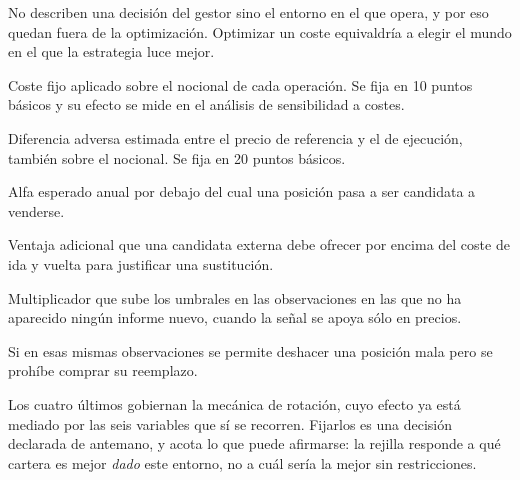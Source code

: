 No describen una decisión del gestor sino el entorno en el que opera, y por eso quedan fuera de la
optimización. Optimizar un coste equivaldría a elegir el mundo en el que la estrategia luce mejor.

\begin{description}[leftmargin=0cm,style=nextline,itemsep=0.5em]
  \item[Comisión] Coste fijo aplicado sobre el nocional de cada operación. Se fija en 10 puntos
  básicos y su efecto se mide en el análisis de sensibilidad a costes.
  \item[\textit{Slippage}] Diferencia adversa estimada entre el precio de referencia y el de
  ejecución, también sobre el nocional. Se fija en 20 puntos básicos.
  \item[Alfa mínimo de salida] Alfa esperado anual por debajo del cual una posición pasa a ser
  candidata a venderse.
  \item[Margen de rotación] Ventaja adicional que una candidata externa debe ofrecer por encima del
  coste de ida y vuelta para justificar una sustitución.
  \item[Endurecimiento sin fundamentales nuevos] Multiplicador que sube los umbrales en las
  observaciones en las que no ha aparecido ningún informe nuevo, cuando la señal se apoya sólo en
  precios.
  \item[Sólo venta sin fundamentales nuevos] Si en esas mismas observaciones se permite deshacer una
  posición mala pero se prohíbe comprar su reemplazo.
\end{description}

Los cuatro últimos gobiernan la mecánica de rotación, cuyo efecto ya está mediado por las seis
variables que sí se recorren. Fijarlos es una decisión declarada de antemano, y acota lo que puede
afirmarse: la rejilla responde a qué cartera es mejor \emph{dado} este entorno, no a cuál sería la
mejor sin restricciones.
